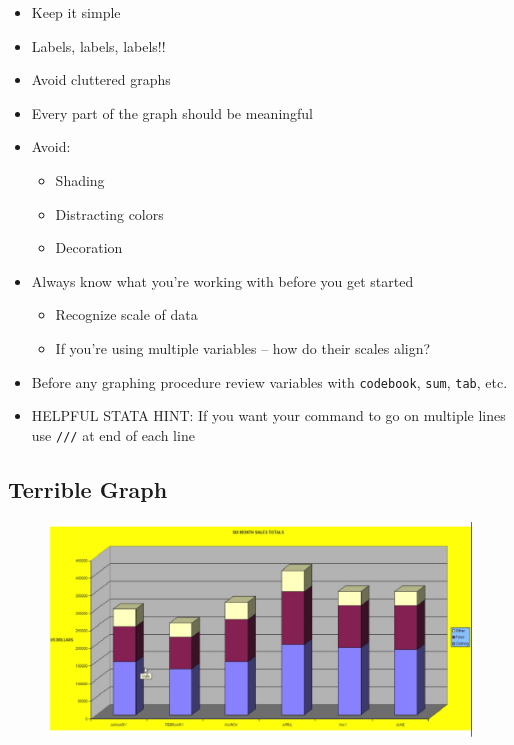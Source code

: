 \documentclass[]{book}
\providecommand{\tightlist}{%
  \setlength{\itemsep}{0pt}\setlength{\parskip}{0pt}}
\begin{document}
\begin{itemize}
\tightlist
\item
  Keep it simple
\item
  Labels, labels, labels!!
\item
  Avoid cluttered graphs
\item
  Every part of the graph should be meaningful
\item
  Avoid:

  \begin{itemize}
  \tightlist
  \item
    Shading
  \item
    Distracting colors
  \item
    Decoration
  \end{itemize}
\item
  Always know what you're working with before you get started

  \begin{itemize}
  \tightlist
  \item
    Recognize scale of data
  \item
    If you're using multiple variables -- how do their scales align?
  \end{itemize}
\item
  Before any graphing procedure review variables with \texttt{codebook},
  \texttt{sum}, \texttt{tab}, etc.
\item
  HELPFUL STATA HINT: If you want your command to go on multiple lines
  use \texttt{///} at end of each line
\end{itemize}

\subsection{Terrible Graph}\label{terrible-graph}

\begin{figure}
\centering
\includegraphics{Stata/StataModGraph/images/Terrible.png}
\caption{}
\end{figure}
\end{document}
